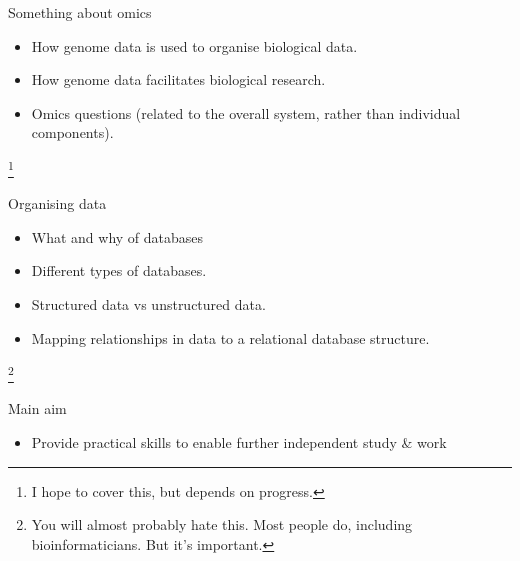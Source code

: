 \documentclass[pdf]{beamer}
\newcommand\blfootnote[1]{%
  \begingroup  %
  \renewcommand\thefootnote{}\footnote{#1}%
  \addtocounter{footnote}{-1}  %
  \endgroup
}
\begin{document}
\begin{frame}{Something about omics}
  \begin{itemize}
    \item How genome data is used to organise biological data.
    \item How genome data facilitates biological research.
    \item Omics questions (related to the overall system, rather than individual components).
  \end{itemize}
  \blfootnote{I hope to cover this, but depends on progress.}
\end{frame}




\begin{frame}{Organising data}
  \begin{itemize}
    \item  What and why of databases
    \item  Different types of databases.
    \item  Structured data vs unstructured data.
    \item  Mapping relationships in data to a relational database structure.
  \end{itemize}
  \blfootnote{You will almost probably hate this. Most people do, including
    bioinformaticians. But it's important.}
\end{frame}

\begin{frame}{Main aim}
  \begin{itemize}
  \item Provide practical skills to enable further independent study \& work
  \end{itemize}
\end{frame}
\end{document}
